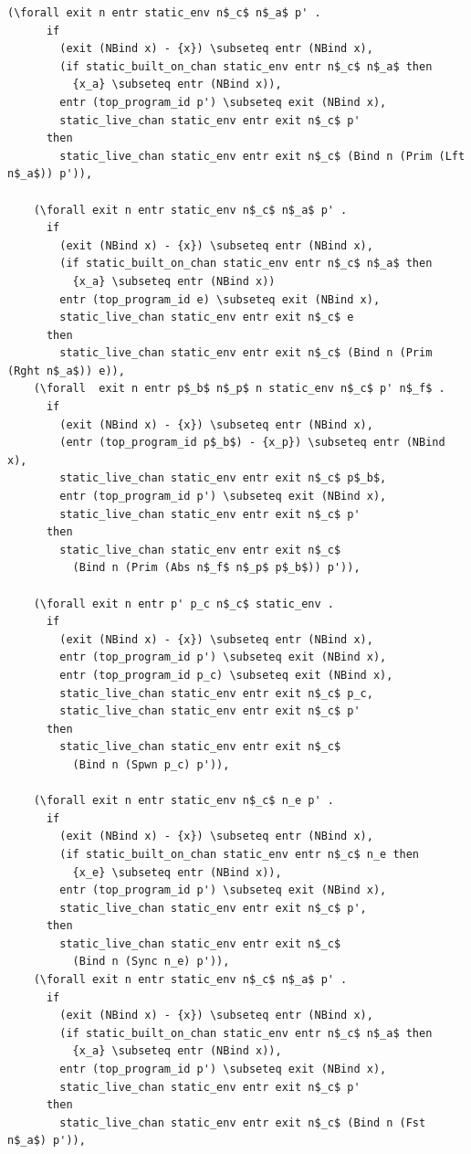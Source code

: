 \documentclass[10pt]{article}
\begin{document}
\begin{lstlisting}[language=logic, mathescape]
    (\forall exit n entr static_env n$_c$ n$_a$ p' . 
      if
        (exit (NBind x) - {x}) \subseteq entr (NBind x),
        (if static_built_on_chan static_env entr n$_c$ n$_a$ then
          {x_a} \subseteq entr (NBind x)),
        entr (top_program_id p') \subseteq exit (NBind x),
        static_live_chan static_env entr exit n$_c$ p'
      then
        static_live_chan static_env entr exit n$_c$ (Bind n (Prim (Lft n$_a$)) p')),

    (\forall exit n entr static_env n$_c$ n$_a$ p' . 
      if
        (exit (NBind x) - {x}) \subseteq entr (NBind x),
        (if static_built_on_chan static_env entr n$_c$ n$_a$ then
          {x_a} \subseteq entr (NBind x))
        entr (top_program_id e) \subseteq exit (NBind x),
        static_live_chan static_env entr exit n$_c$ e
      then
        static_live_chan static_env entr exit n$_c$ (Bind n (Prim (Rght n$_a$)) e)),
    (\forall  exit n entr p$_b$ n$_p$ n static_env n$_c$ p' n$_f$ . 
      if
        (exit (NBind x) - {x}) \subseteq entr (NBind x),
        (entr (top_program_id p$_b$) - {x_p}) \subseteq entr (NBind x),
        static_live_chan static_env entr exit n$_c$ p$_b$,
        entr (top_program_id p') \subseteq exit (NBind x),
        static_live_chan static_env entr exit n$_c$ p'
      then
        static_live_chan static_env entr exit n$_c$
          (Bind n (Prim (Abs n$_f$ n$_p$ p$_b$)) p')),

    (\forall exit n entr p' p_c n$_c$ static_env .
      if
        (exit (NBind x) - {x}) \subseteq entr (NBind x),
        entr (top_program_id p') \subseteq exit (NBind x),
        entr (top_program_id p_c) \subseteq exit (NBind x),
        static_live_chan static_env entr exit n$_c$ p_c,
        static_live_chan static_env entr exit n$_c$ p'
      then
        static_live_chan static_env entr exit n$_c$
          (Bind n (Spwn p_c) p')),

    (\forall exit n entr static_env n$_c$ n_e p' .
      if
        (exit (NBind x) - {x}) \subseteq entr (NBind x),
        (if static_built_on_chan static_env entr n$_c$ n_e then
          {x_e} \subseteq entr (NBind x)),
        entr (top_program_id p') \subseteq exit (NBind x),
        static_live_chan static_env entr exit n$_c$ p',
      then
        static_live_chan static_env entr exit n$_c$
          (Bind n (Sync n_e) p')),
    (\forall exit n entr static_env n$_c$ n$_a$ p' .
      if
        (exit (NBind x) - {x}) \subseteq entr (NBind x),
        (if static_built_on_chan static_env entr n$_c$ n$_a$ then
          {x_a} \subseteq entr (NBind x)),
        entr (top_program_id p') \subseteq exit (NBind x),
        static_live_chan static_env entr exit n$_c$ p'
      then
        static_live_chan static_env entr exit n$_c$ (Bind n (Fst n$_a$) p')),


\end{lstlisting}
\end{document}
